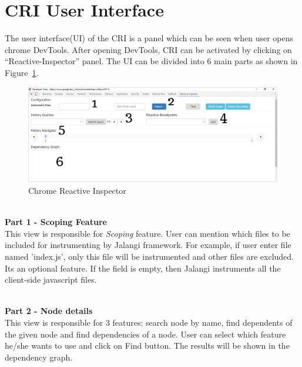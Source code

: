 \section{CRI User Interface}
The user interface(UI) of the CRI is a panel which can be seen when user opens chrome DevTools. After opening DevTools, CRI can be activated by clicking on ``Reactive-Inspector'' panel. The UI can be divided into 6 main parts as shown in Figure~\ref{fig:cri}. 

\begin{figure}[!h]
	\centering
	\includegraphics[scale=0.5,trim=0 0 0 0]{images/cri.png}
	\caption{Chrome Reactive Inspector}
	\label{fig:cri}
\end{figure}

\leavevmode
\\
\textbf{Part 1 - Scoping Feature}
\\
This view is responsible for \textit{Scoping} feature. User can mention which files to be included for instrumenting by Jalangi framework. For example, if user enter file named 'index.js', only this file will be instrumented and other files are excluded. Its an optional feature. If the field is empty, then Jalangi instruments all the client-side javascript files. 

\leavevmode
\\
\textbf{Part 2 - Node details}
\\
This view is responsible for 3 features: search node by name, find dependents of the given node and find dependencies of a node. User can select which feature he/she wants to use and click on Find button. 
The results will be shown in the dependency graph. 

